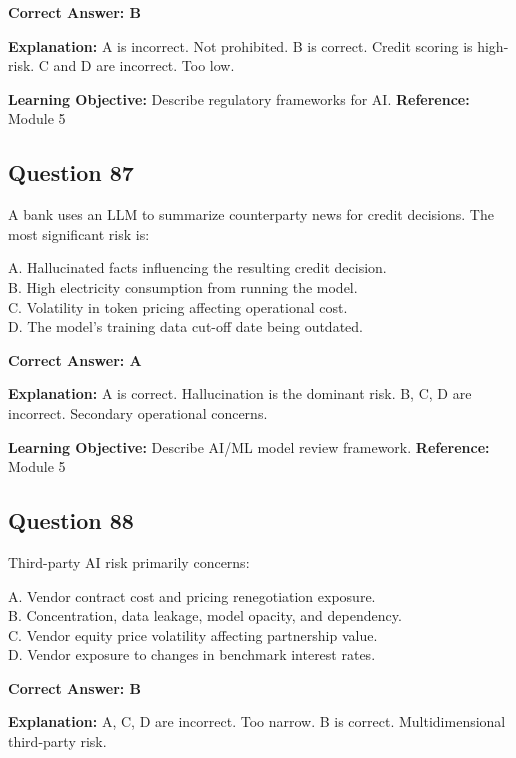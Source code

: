 \documentclass[11pt]{article}
\begin{document}
	\vspace{0.4em}
	\textbf{Correct Answer: B}
	
	\textbf{Explanation:}
	A is incorrect. Not prohibited.
	B is correct. Credit scoring is high-risk.
	C and D are incorrect. Too low.
	
	\textbf{Learning Objective:} Describe regulatory frameworks for AI.
	\textbf{Reference:} Module 5
	
	\subsection*{Question 87}
	A bank uses an LLM to summarize counterparty news for credit decisions.
	The most significant risk is:
	
	A. Hallucinated facts influencing the resulting credit decision.\\
	B. High electricity consumption from running the model.\\
	C. Volatility in token pricing affecting operational cost.\\
	D. The model's training data cut-off date being outdated.
	
	\vspace{0.4em}
	\textbf{Correct Answer: A}
	
	\textbf{Explanation:}
	A is correct. Hallucination is the dominant risk.
	B, C, D are incorrect. Secondary operational concerns.
	
	\textbf{Learning Objective:} Describe AI/ML model review framework.
	\textbf{Reference:} Module 5
	
	\subsection*{Question 88}
	Third-party AI risk primarily concerns:
	
	A. Vendor contract cost and pricing renegotiation exposure.\\
	B. Concentration, data leakage, model opacity, and dependency.\\
	C. Vendor equity price volatility affecting partnership value.\\
	D. Vendor exposure to changes in benchmark interest rates.
	
	\vspace{0.4em}
	\textbf{Correct Answer: B}
	
	\textbf{Explanation:}
	A, C, D are incorrect. Too narrow.
	B is correct. Multidimensional third-party risk.
	
\end{document}
